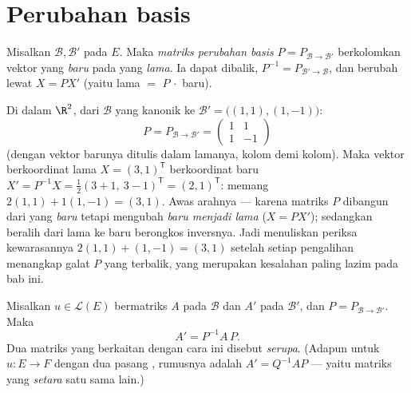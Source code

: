 \section{Perubahan basis}

\begin{definition}\label{def:b1:matrices:changeofbasis}
Misalkan $\mathcal{B}, \mathcal{B}'$  pada $E$. Maka \emph{matriks
perubahan basis} $P =
P_{\mathcal{B}\to\mathcal{B}'}$ berkolomkan 
vektor  yang \emph{baru} pada  yang \emph{lama}. Ia
dapat dibalik, $P^{-1} = P_{\mathcal{B}'\to\mathcal{B}}$, dan
 berubah lewat $X = PX'$ (yaitu lama $=$ $P\,\cdot$ baru).
\end{definition}

\begin{example}
\label{ex:b1:matrices:changerun}
Di dalam $\R^2$, dari $\mathcal B$ yang kanonik ke $\mathcal B' =
\bigl((1,1), (1,-1)\bigr)$:
\[
P = P_{\mathcal B\to\mathcal B'} =
\begin{pmatrix} 1 & 1\\ 1 & -1 \end{pmatrix}
\]
(dengan vektor barunya ditulis dalam  lamanya, kolom demi kolom). Maka
vektor berkoordinat lama $X = (3, 1)^{\mathsf T}$ berkoordinat
baru $X' = P^{-1}X = \frac12(3 + 1,\ 3 - 1)^{\mathsf T} =
(2, 1)^{\mathsf T}$: memang $2(1,1) + 1(1,-1) = (3,1)$. Awas arahnya
--- karena matriks $P$ dibangun dari  yang \emph{baru}
tetapi mengubah  \emph{baru menjadi lama} ($X = PX'$); sedangkan beralih
dari lama ke baru berongkos inversnya. Jadi menuliskan periksa kewarasannya
$2(1,1) + (1,-1) = (3,1)$ setelah setiap pengalihan menangkap
galat $P$ yang terbalik, yang merupakan kesalahan paling lazim pada
bab ini.
\end{example}

\begin{theorem}\label{thm:b1:matrices:conjugation}
Misalkan $u \in \mathcal{L}(E)$ bermatriks $A$ pada $\mathcal{B}$ dan $A'$
pada $\mathcal{B}'$, dan $P = P_{\mathcal{B}\to\mathcal{B}'}$. Maka
\[
A' = P^{-1} A\, P .
\]
Dua matriks yang berkaitan dengan cara ini disebut \emph{serupa}. (Adapun untuk $u \colon E \to F$ dengan dua pasang ,
rumusnya adalah $A' = Q^{-1} A P$ --- yaitu matriks yang \emph{setara}
satu sama lain.)
\end{theorem}

